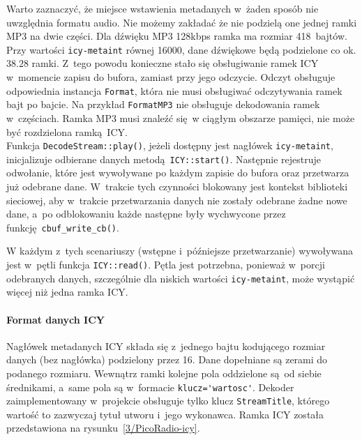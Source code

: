 \documentclass[polish]{aghengthesis}
\begin{document}
			Warto zaznaczyć, że miejsce wstawienia metadanych w~żaden sposób nie uwzględnia formatu audio. Nie możemy zakładać że nie podzielą one jednej ramki MP3 na dwie części. Dla dźwięku MP3 128kbps ramka ma rozmiar 418~bajtów. Przy wartości \lstinline|icy-metaint| równej 16000, dane dźwiękowe będą podzielone co ok. $38.28$ ramki. Z~tego powodu konieczne stało się obsługiwanie ramek ICY w~momencie zapisu do bufora, zamiast przy jego odczycie. Odczyt obsługuje odpowiednia instancja \lstinline|Format|, która nie musi obsługiwać odczytywania ramek bajt po bajcie. Na przykład \lstinline|FormatMP3| nie obsługuje dekodowania ramek w~częściach. Ramka MP3 musi znaleźć się w ciągłym obszarze pamięci, nie może być rozdzielona ramką ICY.
			$ $\\
			
			Funkcja \lstinline|DecodeStream::play()|, jeżeli dostępny jest nagłówek \lstinline|icy-metaint|, inicjalizuje odbierane danych metodą \lstinline|ICY::start()|. Następnie rejestruje odwołanie, które jest wywoływane po każdym zapisie do bufora oraz przetwarza już odebrane dane. W~trakcie tych czynności blokowany jest kontekst biblioteki sieciowej, aby w~trakcie przetwarzania danych nie zostały odebrane żadne nowe dane, a~po odblokowaniu każde następne były wychwycone przez funkcję \lstinline|cbuf_write_cb()|.
			
			W każdym z~tych scenariuszy (wstępne i~późniejsze przetwarzanie) wywoływana jest w~pętli funkcja \lstinline|ICY::read()|. Pętla jest potrzebna, ponieważ w~porcji odebranych danych, szczególnie dla niskich wartości \lstinline|icy-metaint|, może wystąpić więcej niż jedna ramka ICY.
			
			\paragraph{Format danych ICY}
				Nagłówek metadanych ICY składa się z~jednego bajtu kodującego rozmiar danych (bez nagłówka) podzielony przez 16. Dane dopełniane są zerami do podanego rozmiaru. Wewnątrz ramki kolejne pola oddzielone są od siebie średnikami, a~same pola są w~formacie \lstinline|klucz='wartosc'|. Dekoder zaimplementowany w~projekcie obsługuje tylko klucz \lstinline|StreamTitle|, którego wartość to zazwyczaj tytuł utworu i~jego wykonawca. Ramka ICY została przedstawiona na rysunku~\ref{3/PicoRadio-icy}.
				
\end{document}
